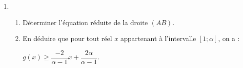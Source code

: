 \begin{enumerate}[resume]
	\item 
	\begin{enumerate}
		\item Déterminer l'équation réduite de la droite $(AB)$.
		\item En déduire que pour tout réel $x$ appartenant à l'intervalle $[1;\alpha]$, on a :
		
		\smallskip
		
		\hfill$g(x) \geqslant \dfrac{- 2}{\alpha - 1} x + \dfrac{2\alpha}{\alpha - 1}$.\hfill~
		
		\vspace{3cm}
	\end{enumerate}
\end{enumerate}


